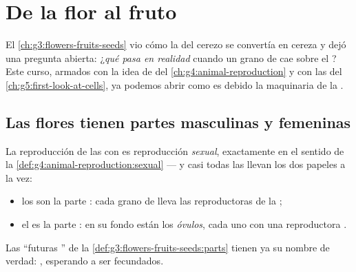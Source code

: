 \chapter{De la flor al fruto}\label{ch:g5:flower-to-fruit}

El \cref{ch:g3:flowers-fruits-seeds} vio cómo la  del cerezo se
convertía en cereza y dejó una pregunta abierta: ¿\emph{qué pasa en
realidad} cuando un grano de  cae sobre el ? Este curso,
armados con la idea de  del
\cref{ch:g4:animal-reproduction} y con las  del
\cref{ch:g5:first-look-at-cells}, ya podemos abrir como es debido la
maquinaria de la .

\section{Las flores tienen partes masculinas y femeninas}

\begin{proposition}\label{prop:g5:flower-to-fruit:roles}
La reproducción de las  con  es reproducción
\emph{sexual}, exactamente en el sentido de la
\cref{def:g4:animal-reproduction:sexual} --- y casi todas las 
llevan los dos papeles a la vez:
\begin{itemize}
  \item los \emph{} son la parte : cada grano de
        \emph{} lleva las  reproductoras  de la
        ;
  \item el \emph{} es la parte : en su fondo están los
        \emph{óvulos}, cada uno con una 
        reproductora .
\end{itemize}
Las ``futuras '' de la
\cref{def:g3:flowers-fruits-seeds:parts} tienen ya su nombre de
verdad: , esperando a ser fecundados.
\end{proposition}
\admitted

